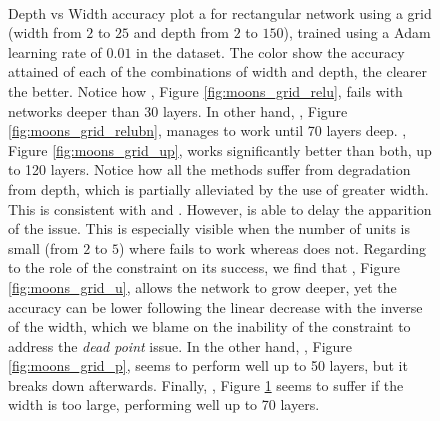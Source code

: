 \begin{figure}
\begin{subfigure}[b]{0.3\textwidth}
        \caption{\SepLayer}
        \label{fig:moons_grid_l}
    \end{subfigure}
    ~ %
    
  \caption{Depth vs Width accuracy plot a for rectangular network using a grid (width from $2$ to $25$ and depth from $2$ to $150$),  trained using a Adam learning rate of $0.01$ in the \moons dataset. The color show the accuracy attained of each of the combinations of width and depth, the clearer the better. Notice how \ReLU, Figure \ref{fig:moons_grid_relu}, fails with networks deeper than 30 layers. In other hand, \ReLUBN, Figure \ref{fig:moons_grid_relubn}, manages to work until 70 layers deep. \SepUnitPoint,  Figure \ref{fig:moons_grid_up}, works significantly better than both, up to 120 layers. Notice how all the methods suffer from degradation from depth, which is partially alleviated by the use of greater width. This is consistent with \cite{simpnet} and \cite{densenet}. However, \SepUnitPoint is able to delay the apparition of the issue. This is especially visible when the number of units is small (from $2$ to $5$) where \ReLUBN fails to work whereas \SepUnitPoint does not. Regarding to the role of the constraint on its success, we find that \SepUnit, Figure \ref{fig:moons_grid_u}, allows the network to grow deeper, yet the accuracy can be lower following the linear decrease with the inverse of the width, which we blame on the inability of the \SepUnit constraint to address the \emph{dead point} issue. In the other hand, \SepPoint, Figure \ref{fig:moons_grid_p}, seems to perform well up to 50 layers, but it breaks down afterwards. Finally, \SepLayer , Figure \ref{fig:moons_grid_l} seems to suffer if the width is too large, performing well up to 70 layers.}
  \label{fig:moons_grid} 
\end{figure}


